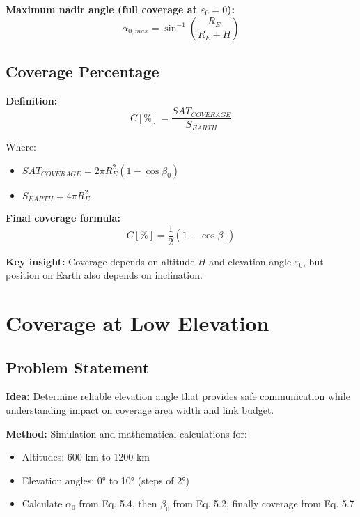 \documentclass[11pt,letterpaper]{article}
\begin{document}
\textbf{Maximum nadir angle (full coverage at $\varepsilon_0 = 0$):}
\begin{equation}
\alpha_{0,max} = \sin^{-1}\left(\frac{R_E}{R_E + H}\right)
\end{equation}

\subsection{Coverage Percentage}

\textbf{Definition:}
\begin{equation}
C[\%] = \frac{SAT_{COVERAGE}}{S_{EARTH}}
\end{equation}

Where:
\begin{itemize}
    \item $SAT_{COVERAGE} = 2\pi R_E^2 (1 - \cos\beta_0)$
    \item $S_{EARTH} = 4\pi R_E^2$
\end{itemize}

\textbf{Final coverage formula:}
\begin{equation}
C[\%] = \frac{1}{2}(1 - \cos\beta_0)
\end{equation}

\textbf{Key insight:} Coverage depends on altitude $H$ and elevation angle $\varepsilon_0$, but position on Earth also depends on inclination.

\section{Coverage at Low Elevation}

\subsection{Problem Statement}
\textbf{Idea:} Determine reliable elevation angle that provides safe communication while understanding impact on coverage area width and link budget.

\textbf{Method:} Simulation and mathematical calculations for:
\begin{itemize}
    \item Altitudes: 600 km to 1200 km
    \item Elevation angles: 0° to 10° (steps of 2°)
    \item Calculate $\alpha_0$ from Eq. 5.4, then $\beta_0$ from Eq. 5.2, finally coverage from Eq. 5.7
\end{itemize}
\end{document}
